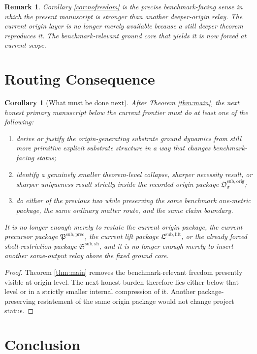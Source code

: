 \documentclass[11pt]{article}
\newcommand{\OriginPackage}{\mathfrak O^{\mathrm{sub,orig}}}
\newcommand{\PrecursorPackage}{\mathfrak P^{\mathrm{sub,prec}}}
\newcommand{\LiftPackage}{\mathfrak L^{\mathrm{sub,lift}}}
\newcommand{\ShellRestriction}{\mathfrak S^{\mathrm{sub,sh}}}
\newtheorem{remark}{Remark}
\newtheorem{corollary}{Corollary}
\begin{document}
\begin{remark}
Corollary \ref{cor:nofreedom} is the precise benchmark-facing sense in which the present manuscript is stronger than another deeper-origin relay. The current origin layer is no longer merely available because a still deeper theorem reproduces it. The benchmark-relevant ground core that yields it is now forced at current scope.
\end{remark}

\section{Routing Consequence}

\begin{corollary}[What must be done next]
\label{cor:next}
After Theorem \ref{thm:main}, the next honest primary manuscript below the current frontier must do at least one of the following:
\begin{enumerate}
    \item derive or justify the origin-generating substrate ground dynamics from still more primitive explicit substrate structure in a way that changes benchmark-facing status;
    \item identify a genuinely smaller theorem-level collapse, sharper necessity result, or sharper uniqueness result strictly inside the recorded origin package \(\OriginPackage_{\sigma}\);
    \item do either of the previous two while preserving the same benchmark one-metric package, the same ordinary matter route, and the same claim boundary.
\end{enumerate}
It is no longer enough merely to restate the current origin package, the current precursor package \(\PrecursorPackage\), the current lift package \(\LiftPackage\), or the already forced shell-restriction package \(\ShellRestriction\), and it is no longer enough merely to insert another same-output relay above the fixed ground core.
\end{corollary}

\begin{proof}
Theorem \ref{thm:main} removes the benchmark-relevant freedom presently visible at origin level. The next honest burden therefore lies either below that level or in a strictly smaller internal compression of it. Another package-preserving restatement of the same origin package would not change project status.
\end{proof}

\section{Conclusion}
\end{document}
